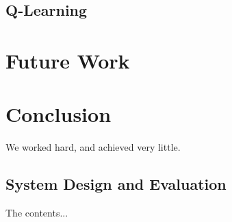 \documentclass[12pt, oneside]{report}
\begin{document}
\section{Q-Learning}\label{qlearning}

\chapter{Future Work}\label{future work}

\chapter{Conclusion}\label{conclusion}
We worked hard, and achieved very little.

\pagebreak




\begin{appendices}
\chapter{System Design and Evaluation}
The contents...



\end{appendices}
\end{document}
